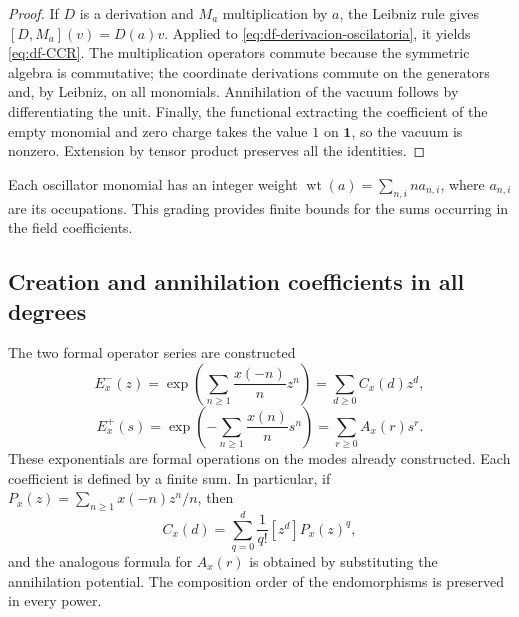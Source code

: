 \begin{proof}
If \(D\) is a derivation and \(M_a\) multiplication by \(a\), the Leibniz rule gives \([D,M_a](v)=D(a)v\). Applied to \eqref{eq:df-derivacion-oscilatoria}, it yields \eqref{eq:df-CCR}. The multiplication operators commute because the symmetric algebra is commutative; the coordinate derivations commute on the generators and, by Leibniz, on all monomials. Annihilation of the vacuum follows by differentiating the unit. Finally, the functional extracting the coefficient of the empty monomial and zero charge takes the value \(1\) on \(\mathbf1\), so the vacuum is nonzero. Extension by tensor product preserves all the identities.
\end{proof}

Each oscillator monomial has an integer weight \(\operatorname{wt}(a)=\sum_{n,i}n a_{n,i}\), where \(a_{n,i}\) are its occupations. This grading provides finite bounds for the sums occurring in the field coefficients.

\subsection{Creation and annihilation coefficients in all degrees}
\label{subsec:df-exponenciales}


The two formal operator series are constructed
\begin{equation}
 E^-_x(z)=\exp\!\left(\sum_{n\geq1}\frac{x(-n)}n z^n\right)
         =\sum_{d\geq0}C_x(d)z^d,
 \label{eq:df-creacion}
\end{equation}
\begin{equation}
 E^+_x(s)=\exp\!\left(-\sum_{n\geq1}\frac{x(n)}n s^n\right)
         =\sum_{r\geq0}A_x(r)s^r.
 \label{eq:df-aniquilacion}
\end{equation}
These exponentials are formal operations on the modes already constructed. Each coefficient is defined by a finite sum. In particular, if \(P_x(z)=\sum_{n\geq1}x(-n)z^n/n\), then
\begin{equation}
 C_x(d)=\sum_{q=0}^{d}\frac1{q!}[z^d]P_x(z)^q,
 \label{eq:df-coeficiente-creacion}
\end{equation}
and the analogous formula for \(A_x(r)\) is obtained by substituting the annihilation potential. The composition order of the endomorphisms is preserved in every power.

